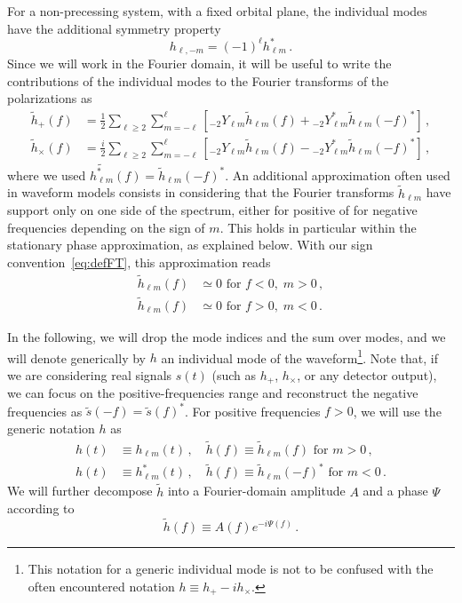 \documentclass[aps,showpacs,twocolumn,
prd,superscriptaddress,nofootinbib]{revtex4-1}
\newcommand{\be}{\begin{equation}}
\newcommand{\ee}{\end{equation}}
\newcommand{\nn}{\nonumber}
\begin{document}
For a non-precessing system, with a fixed orbital plane, the individual modes have the additional symmetry property
\be\label{eq:symmetryhlminusm}
	h_{\ell, -m} = (-1)^{\ell} h_{\ell m}^{*} \,.
\ee
Since we will work in the Fourier domain, it will be useful to write the contributions of the individual modes to the Fourier transforms of the polarizations as
\begin{subequations}\label{eq:hpcfrommodes}
\begin{align}
	\tilde{h}_{+}(f) &= \frac{1}{2} \sum\limits_{\ell \geq 2} \sum\limits_{m=-\ell}^{\ell} \left[ {}_{-2}Y_{\ell m} \tilde{h}_{\ell m}(f) + {}_{-2}Y_{\ell m}^{*} \tilde{h}_{\ell m}(-f)^{*} \right] \,, \\
	\tilde{h}_{\times}(f) &= \frac{i}{2} \sum\limits_{\ell \geq 2} \sum\limits_{m=-\ell}^{\ell} \left[ {}_{-2}Y_{\ell m} \tilde{h}_{\ell m}(f) - {}_{-2}Y_{\ell m}^{*} \tilde{h}_{\ell m}(-f)^{*} \right] \,,
\end{align}
\end{subequations}
where we used $\widetilde{h_{\ell m}^{*}}(f) = \tilde{h}_{\ell m}(-f)^{*}$. An additional approximation often used in waveform models consists in considering that the Fourier transforms $\tilde{h}_{\ell m}$ have support only on one side of the spectrum, either for positive of for negative frequencies depending on the sign of $m$. This holds in particular within the stationary phase approximation, as explained below. With our sign convention~\eqref{eq:defFT}, this approximation reads
\begin{align}\label{eq:zeronegativef}
	\tilde{h}_{\ell m} (f) &\simeq 0 \text{ for } f<0, \; m>0 \nn\,,\\
	\tilde{h}_{\ell m} (f) &\simeq 0 \text{ for } f>0, \; m<0 \,.
\end{align}

In the following, we will drop the mode indices and the sum over modes, and we will denote generically by $h$ an individual mode of the waveform\footnote{This notation for a generic individual mode is not to be confused with the often encountered notation $h\equiv h_{+} - i h_{\times}$.}. Note that, if we are considering real signals $s(t)$ (such as $h_{+}$, $h_{\times}$, or any detector output), we can focus  on the positive-frequencies range and reconstruct the negative frequencies as $\tilde{s}(-f) = \tilde{s}(f)^{*}$. For positive frequencies $f>0$, we will use the generic notation $h$ as
\begin{align}\label{eq:notationhsignm}
	h(t) &\equiv h_{\ell m}(t) \,, \quad \tilde{h}(f) \equiv \tilde{h}_{\ell m}(f) \text{ for } m>0 \,, \nn\\
	h(t) &\equiv h_{\ell m}^{*}(t) \,, \quad \tilde{h}(f) \equiv \tilde{h}_{\ell m}(-f)^{*} \text{ for } m<0 \,.
\end{align}
We will further decompose $\tilde{h}$ into a Fourier-domain amplitude $A$ and a phase $\Psi$ according to
\be\label{eq:defAPsi}
	\tilde{h}(f) \equiv A(f) e^{-i\Psi(f)} \,.
\ee
\end{document}
